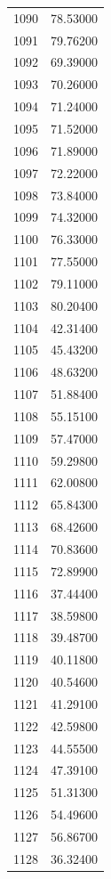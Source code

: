 \documentclass[
  letterpaper,
  DIV=11,
  numbers=noendperiod]{scrreprt}
\begin{document}
\begin{tcolorbox}
\begin{tabular}{lr}
1090 &         78.53000 \\
1091 &         79.76200 \\
1092 &         69.39000 \\
1093 &         70.26000 \\
1094 &         71.24000 \\
1095 &         71.52000 \\
1096 &         71.89000 \\
1097 &         72.22000 \\
1098 &         73.84000 \\
1099 &         74.32000 \\
1100 &         76.33000 \\
1101 &         77.55000 \\
1102 &         79.11000 \\
1103 &         80.20400 \\
1104 &         42.31400 \\
1105 &         45.43200 \\
1106 &         48.63200 \\
1107 &         51.88400 \\
1108 &         55.15100 \\
1109 &         57.47000 \\
1110 &         59.29800 \\
1111 &         62.00800 \\
1112 &         65.84300 \\
1113 &         68.42600 \\
1114 &         70.83600 \\
1115 &         72.89900 \\
1116 &         37.44400 \\
1117 &         38.59800 \\
1118 &         39.48700 \\
1119 &         40.11800 \\
1120 &         40.54600 \\
1121 &         41.29100 \\
1122 &         42.59800 \\
1123 &         44.55500 \\
1124 &         47.39100 \\
1125 &         51.31300 \\
1126 &         54.49600 \\
1127 &         56.86700 \\
1128 &         36.32400 \\

\end{tabular}
\end{tcolorbox}
\end{document}
